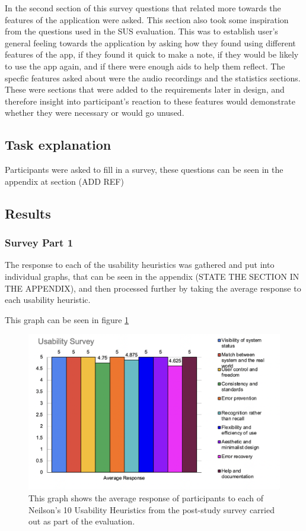 \documentclass{l4proj}
\begin{document}
In the second section of this survey questions that related more towards the features of the application were asked. This section also took some inspiration from the questions used in the SUS evaluation. This was to establish user's general feeling towards the application by asking how they found using different features of the app, if they found it quick to make a note, if they would be likely to use the app again, and if there were enough aids to help them reflect. The specfic features asked about were the audio recordings and the statistics sections. These were sections that were added to the requirements later in design, and therefore insight into participant's reaction to these features would demonstrate whether they were necessary or would go unused. 

\subsection{Task explanation}

Participants were asked to fill in a survey, these questions can be seen in the appendix at section (ADD REF)

\subsection{Results}

\subsubsection{Survey Part 1}
 
The response to each of the usability heuristics was gathered and put into individual graphs, that can be seen in the appendix (STATE THE SECTION IN THE APPENDIX), and then processed further by taking the average response to each usability heuristic.

This graph can be seen in figure \ref{fig: UserStudyGraph}

\begin{figure}
    \begin{centering}
    \includegraphics[scale=0.75]{images/UserStudyGraph.png}
    \caption{This graph shows the average response of participants to each of Neilson's 10 Usability Heuristics from the post-study survey carried out as part of the evaluation.}
    \label{fig: UserStudyGraph}
    \end{centering}
\end{figure}
 
\end{document}
